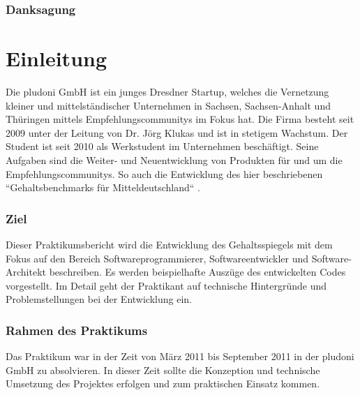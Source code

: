 \section{Danksagung}
\part{Einleitung}
Die pludoni GmbH ist ein junges Dresdner Startup, welches die Vernetzung kleiner und mittelständischer Unternehmen in Sachsen, Sachsen-Anhalt und Thüringen 
mittels Empfehlungscommunitys im Fokus hat. Die Firma besteht seit 2009 unter der Leitung von Dr. Jörg Klukas und ist in stetigem Wachstum. 
Der Student ist seit 2010 als Werkstudent im Unternehmen beschäftigt. Seine Aufgaben sind die Weiter- und Neuentwicklung von Produkten für und um die Empfehlungscommunitys. 
So auch die Entwicklung des hier beschriebenen ``Gehaltsbenchmarks für
Mitteldeutschland`` \citep{Gehaltsbenchmark}.
\section{Ziel}
Dieser Praktikumsbericht wird die Entwicklung des Gehaltsspiegels mit dem Fokus auf den Bereich Softwareprogrammierer, Softwareentwickler und Software-Architekt beschreiben. 
Es werden beispielhafte Auszüge des entwickelten Codes vorgestellt. Im Detail geht der Praktikant auf technische Hintergründe und Problemstellungen bei der Entwicklung ein.
\section{Rahmen des Praktikums}
Das Praktikum war in der Zeit von März 2011 bis September 2011 in der pludoni GmbH zu absolvieren. 
In dieser Zeit sollte die Konzeption und technische Umsetzung des Projektes erfolgen und zum praktischen Einsatz kommen.
